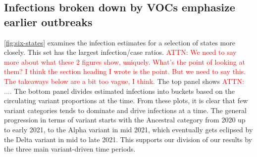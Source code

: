 \documentclass{article}
\newcommand{\attn }[1]{\textcolor{red}{ATTN: #1}}
\begin{document}
    
\subsection{Infections broken down by VOCs emphasize earlier outbreaks}
\label{sec:infections-by-voc}

\autoref{fig:six-states} examines the infection estimates for a selection of
states more closely. This set has the largest infection/case ratios. 
\attn{We need to say more about what these 2 figures show, uniquely. What's the
point of looking at them? I think the section heading I wrote is the point. But
we need to say this. The takeaways below are a bit too vague, I think.} The top
panel shows \attn{....} The bottom panel divides estimated
infections into buckets based on the circulating variant proportions at the
time. From these plots, it is clear that few variant categories tends to
dominate and drive infections at a time. The general progression in terms of
variant starts with the Ancestral category from 2020 up to early 2021, to the
Alpha variant in mid 2021, which eventually gets eclipsed by the Delta variant
in mid to late 2021. This supports our division of our results by the three main
variant-driven time periods.
\end{document}
